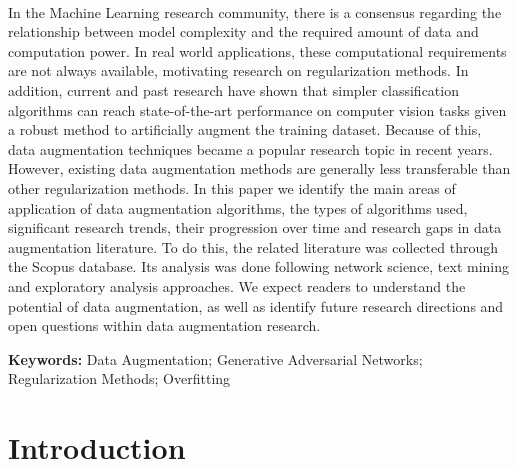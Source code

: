 ~\label{chp:data-augmentation-trends}
\graphicspath{{figures/data-augmentation-trends/}}

\begin{adjustwidth}{30pt}{30pt}

    In the Machine Learning research community, there is a consensus regarding
    the relationship between model complexity and the required amount of data
    and computation power. In real world applications, these computational
    requirements are not always available, motivating research on
    regularization methods. In addition, current and past research have shown
    that simpler classification algorithms can reach state-of-the-art
    performance on computer vision tasks given a robust method to artificially
    augment the training dataset. Because of this, data augmentation
    techniques became a popular research topic in recent years. However,
    existing data augmentation methods are generally less transferable than
    other regularization methods. In this paper we identify the main areas of
    application of data augmentation algorithms, the types of algorithms used,
    significant research trends, their progression over time and research gaps
    in data augmentation literature. To do this, the related literature was
    collected through the Scopus database. Its analysis was done following
    network science, text mining and exploratory analysis approaches. We
    expect readers to understand the potential of data augmentation, as well
    as identify future research directions and open questions within data
    augmentation research.

\end{adjustwidth}

\vspace{.5cm}
\textbf{Keywords:} Data Augmentation; Generative Adversarial Networks; Regularization
Methods; Overfitting

\section{Introduction}~\label{sec:introduction-aug}

